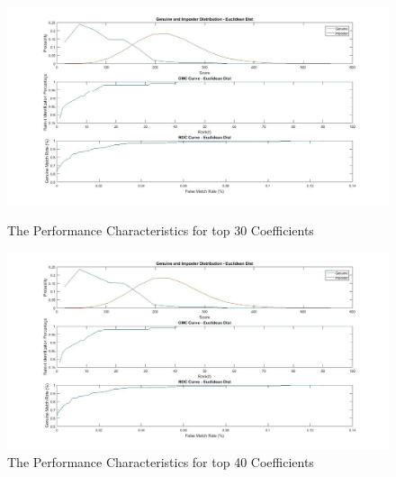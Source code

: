 \documentclass[conference]{IEEEtran}
\begin{document}
\begin{enumerate}
\begin{figure}
\centering
\includegraphics[width=20cm]{forTop30Coeffecients.jpg}
\caption{The Performance Characteristics for top 30 Coefficients}
\label{top30Coef}
\includegraphics[width=20cm]{forTop40Coeffecients.jpg}
\caption{The Performance Characteristics for top 40 Coefficients}
\label{top40Coef}
\end{figure}


\end{enumerate}
\end{document}
